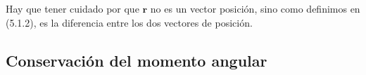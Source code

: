Hay que tener cuidado por que $\mathbf{r}$ no es un vector posición, sino como definimos en (5.1.2), es la diferencia entre los dos vectores de posición.
\subsection{Conservación del momento angular} 